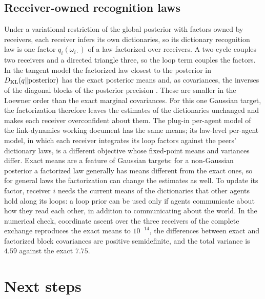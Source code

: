 \documentclass[11pt,letterpaper]{report}
\begin{document}
\section{Receiver-owned recognition laws}

Under a variational restriction of the global posterior with factors owned by receivers, each receiver infers its own dictionaries, so its dictionary recognition law is one factor $q_i(\omega_{i\cdot})$ of a law factorized over receivers. A two-cycle couples two receivers and a directed triangle three, so the loop term couples the factors. In the tangent model the factorized law closest to the posterior in $D_{\mathrm{KL}}(q\Vert\text{posterior})$ has the exact posterior means and, as covariances, the inverses of the diagonal blocks of the posterior precision \citep[Section~10.1.2]{Bishop2006}. These are smaller in the Loewner order than the exact marginal covariances. For this one Gaussian target, the factorization therefore leaves the estimates of the dictionaries unchanged and makes each receiver overconfident about them. The plug-in per-agent model of the link-dynamics working document has the same means; its law-level per-agent model, in which each receiver integrates its loop factors against the peers' dictionary laws, is a different objective whose fixed-point means and variances differ. Exact means are a feature of Gaussian targets: for a non-Gaussian posterior a factorized law generally has means different from the exact ones, so for general laws the factorization can change the estimates as well. To update its factor, receiver $i$ needs the current means of the dictionaries that other agents hold along its loops: a loop prior can be used only if agents communicate about how they read each other, in addition to communicating about the world. In the numerical check, coordinate ascent over the three receivers of the complete exchange reproduces the exact means to $10^{-14}$, the differences between exact and factorized block covariances are positive semidefinite, and the total variance is $4.59$ against the exact $7.75$.

\chapter{Next steps}
\label{it1:ch-next}
\end{document}
